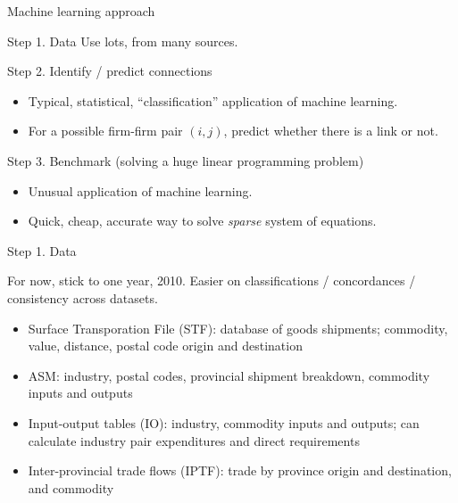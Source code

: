 \documentclass[12pt]{beamer}
\begin{document}
\begin{frame}{Machine learning approach}

\begin{block}{Step 1. Data}
Use lots, from many sources.
\end{block}

\begin{block}{Step 2. Identify / predict connections}
\begin{itemize}
\item Typical, statistical, ``classification'' application of machine learning. 
\item For a possible firm-firm pair $(i,j)$, predict whether there is a link or not. 
\end{itemize}
\end{block}

\begin{block}{Step 3. Benchmark (solving a huge linear programming problem)}
\begin{itemize}
\item Unusual application of machine learning.
\item Quick, cheap, accurate way to solve \emph{sparse} system of equations.
\end{itemize}
\end{block}

\end{frame}


\begin{frame}{Step 1. Data}

For now, stick to one year, 2010. Easier on classifications / concordances / consistency across datasets. 

\begin{itemize}
\item Surface Transporation File (STF): database of goods shipments; commodity, value, distance, postal code origin and destination
\item ASM: industry, postal codes, provincial shipment breakdown, commodity inputs and outputs
\item Input-output tables (IO): industry, commodity inputs and outputs; can calculate industry pair expenditures and direct requirements
\item Inter-provincial trade flows (IPTF): trade by province origin and destination, and commodity
\end{itemize}

% 

\end{frame}
\end{document}
